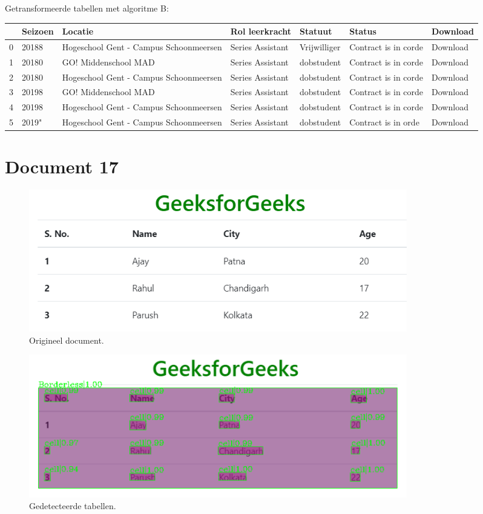 Getransformeerde tabellen met algoritme B:

\begin{tabular}{lllllll}
\toprule
{} & Seizoen &                                 Locatie &    Rol leerkracht &       Statuut &                Status &  Download \\
\midrule
0 &   20188 &  Hogeschool Gent - Campus Schoonmeersen &  Series Assistant &  Vrijwilliger &  Contract is in corde &  Download \\
1 &   20180 &                    GO! Middenschool MAD &  Series Assistant &    dobstudent &  Contract is in corde &  Download \\
2 &   20180 &  Hogeschool Gent - Campus Schoonmeersen &  Series Assistant &    dobstudent &  Contract is in corde &  Download \\
3 &   20198 &                    GO! Middenschool MAD &  Series Assistant &    dobstudent &  Contract is in corde &  Download \\
4 &   20198 &  Hogeschool Gent - Campus Schoonmeersen &  Series Assistant &    dobstudent &  Contract is in corde &  Download \\
5 &   2019" &  Hogeschool Gent - Campus Schoonmeersen &  Series Assistant &    dobstudent &   Contract is in orde &  Download \\
\bottomrule
\end{tabular}
\section{Document 17}

\begin{figure}[H]
    \centering
    \includegraphics[width=0.8\textwidth]{test-resultaten/17/original.png}
    \caption{Origineel document.}
\end{figure}

\begin{figure}[H]
    \centering
    \includegraphics[width=0.8\textwidth]{test-resultaten/17/detected_tables.png}
    \caption{Gedetecteerde tabellen.}
\end{figure}

